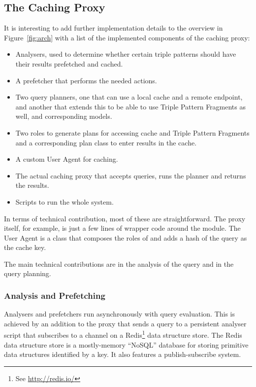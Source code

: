 \subsection{The Caching Proxy}\label{sec:cacher}

It is interesting to add further implementation details to the
overview in Figure~\ref{fig:arch} with a list of the implemented
components of the caching proxy:

\begin{itemize}
\item Analysers, used to determine whether certain triple patterns
  should have their results prefetched and cached.
\item A prefetcher that performs the needed actions.
\item Two query planners, one that can use a local cache and a remote
  endpoint, and another that extends this to be able to use Triple
  Pattern Fragments as well, and corresponding models.
\item Two roles to generate plans for accessing cache and Triple
  Pattern Fragments and a corresponding plan class to enter results
  in the cache.
\item A custom User Agent for caching.
\item The actual caching proxy that accepts queries, runs the planner
  and returns the results.
\item Scripts to run the whole system.
\end{itemize}

In terms of technical contribution, most of these are
straightforward. The proxy itself, for example, is just a few lines of
wrapper code around the  module. The User
Agent is a class that composes the roles of
 and adds a hash of the query as
the cache key.

The main technical contributions are in the analysis of the query and
in the query planning.

\subsubsection{Analysis and Prefetching}\label{sec:analimpl}

Analysers and prefetchers run asynchronously with query
evaluation. This is achieved by an addition to the proxy that sends a
query to a persistent analyser script that subscribes to a channel on
a Redis\footnote{See \url{http://redis.io/}} data structure store. The
Redis data structure store is a mostly-memory ``NoSQL'' database for
storing primitive data structures identified by a key. It also
features a publish-subscribe system.

